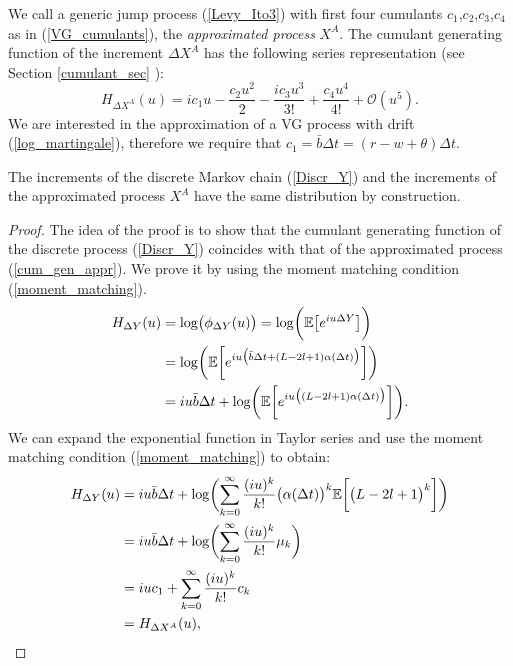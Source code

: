 We call a generic jump process (\ref{Levy_Ito3}) with first four cumulants $c_1$,$c_2$,$c_3$,$c_4$ as in (\ref{VG_cumulants}), 
the \emph{approximated process} $X^A$. 
The cumulant generating function of the increment $\Delta X^A$ has the following series representation (see Section \ref{cumulant_sec} ):
\begin{equation}\label{cum_gen_appr}
 H_{\Delta X^{A}}(u) = ic_1 u -\frac{c_2u^2}{2} -\frac{ic_3u^3}{3!} + \frac{c_4u^4}{4!} + \mathcal{O}(u^5).
\end{equation}
We are interested in the approximation of a VG process with drift (\ref{log_martingale}), therefore we require that $c_1 = \bar b \Delta t = (r-w+\theta)\Delta t$. 
\begin{Theorem}
The increments of the discrete Markov chain (\ref{Discr_Y}) and the increments of the approximated process $X^A$ have the same distribution by construction.
\end{Theorem}
\begin{proof}
The idea of the proof is to show that the cumulant generating function of the discrete process (\ref{Discr_Y}) 
coincides with that of the approximated process (\ref{cum_gen_appr}). We prove it by using the moment
matching condition (\ref{moment_matching}).
\begin{align}
H_{\Delta Y}(u) &= \log \bigl( \phi_{\Delta Y}(u)  \bigr) = \log \biggl( \mathbb{E} \bigl[ e^{iu \Delta Y} \bigr] \biggr) \\ \nonumber
                &= \log \biggl( \mathbb{E} \biggl[ e^{iu \bigl( \bar b \Delta t + (L-2l+1) \alpha(\Delta t) \bigr) } \biggr] \biggr) \\ \nonumber
		&= iu \bar b \Delta t + \log \biggl( \mathbb{E} \biggl[ e^{iu \bigl(  (L-2l+1) \alpha(\Delta t) \bigr) } \biggr] \biggr).
\end{align}
We can expand the exponential function in Taylor series and use the moment matching condition (\ref{moment_matching}) to obtain:
\begin{align}
H_{\Delta Y}(u) &= iu \bar b \Delta t + \log \biggl( \sum_{k=0}^{\infty} \frac{(iu)^k}{k!} 
\bigl(\alpha(\Delta t)\bigr)^k \mathbb{E} \biggl[ \bigl( L-2l+1  \bigr)^k \biggr] \biggr) \\ \nonumber
                &= iu \bar b \Delta t + \log \biggl( \sum_{k=0}^{\infty} \frac{(iu)^k}{k!} \mu_k \biggr) \\ \nonumber
                &= iu c_1 + \sum_{k=0}^{\infty} \frac{(iu)^k}{k!} c_k \\ \nonumber 
                &= H_{\Delta X^{A}}(u),
\end{align}
\end{proof}
